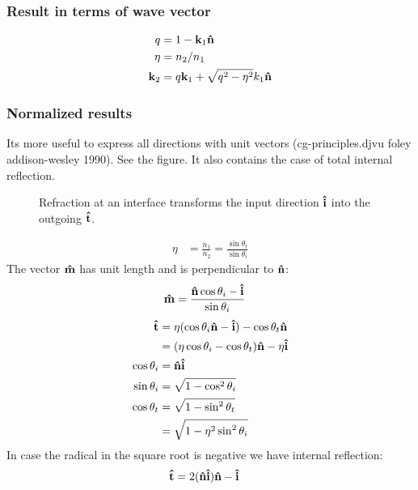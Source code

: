 \documentclass[11pt]{article}
\begin{document}
\subsubsection{Result in terms of wave vector}
\begin{align}
  q &= 1-\mathbf{k}_1 \mathbf{\hat{n}}\\
  \eta &= n_2/n_1\\
  \mathbf{k}_2 &= q \mathbf{k}_1 + \sqrt{q^2-\eta^2} k_1\mathbf{\hat{n}}
\end{align}
\subsubsection{Normalized results}
Its more useful to express all directions with unit vectors
(cg-principles.djvu foley addison-wesley 1990). See the figure.
It also contains the case of total internal reflection.
 \begin{figure}
   \centering
   
   \caption{Refraction at an interface transforms the input direction
     $\mathbf{\hat{i}}$ into the outgoing $\mathbf{\hat{t}}$.}
 \end{figure}
 \begin{align}
   \eta&=\frac{n_1}{n_2}=\frac{\sin\theta_t}{\sin\theta_i}
 \end{align}
 The vector $\mathbf{\hat{m}}$ has unit length and is perpendicular to $\mathbf{\hat{n}}$:
 \begin{align}
   \mathbf{\hat{m}}&=\frac{\mathbf{\hat{n}}\cos\theta_i - \mathbf{\hat{i}}}{\sin\theta_i}
 \end{align}
 \begin{align}
   \mathbf{\hat{t}}&=\eta(\cos\theta_i\mathbf{\hat{n}}-\mathbf{\hat{i}})-\cos\theta_t\mathbf{\hat{n}}\\
   &=(\eta\cos\theta_i-\cos\theta_t)\mathbf{\hat{n}}-\eta\mathbf{\hat{i}}\\
   \cos\theta_i&=\mathbf{\hat{n}}\mathbf{\hat{i}}\\
   \sin\theta_i&=\sqrt{1-\cos^2\theta_i}\\
   \cos\theta_t&=\sqrt{1-\sin^2\theta_t}\\
   &=\sqrt{1-\eta^2\sin^2\theta_i}
 \end{align}
 In case the radical in the square root is negative we have internal reflection:
 \begin{align}
   \mathbf{\hat{t}}&=2(\mathbf{\hat{n}}\mathbf{\hat{i}})\mathbf{\hat{n}}-\mathbf{\hat{i}}
 \end{align}
\end{document}

